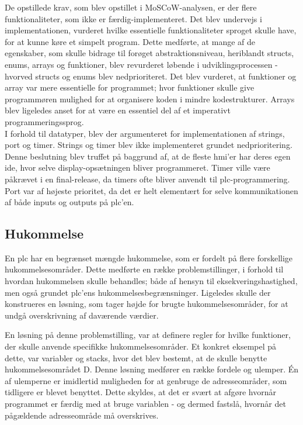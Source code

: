 \noindent De opstillede krav, som blev opstillet i MoSCoW-analysen, er der flere funktionaliteter, som ikke er færdig-implementeret. Det blev undervejs i implementationen, vurderet hvilke essentielle funktionaliteter sproget skulle have, for at kunne køre et simpelt program. Dette medførte, at mange af de egenskaber, som skulle bidrage til forøget abstraktionsniveau, heriblandt structs, enums, arrays og funktioner, blev revurderet løbende i udviklingsprocessen - hvorved structs og enums blev nedprioriteret. Det blev vurderet, at funktioner og array var mere essentielle for programmet; hvor funktioner skulle give programmøren mulighed for at organisere koden i mindre kodestrukturer. Arrays blev ligeledes anset for at være en essentiel del af et imperativt programmeringssprog. \\

\noindent I forhold til datatyper, blev der argumenteret for implementationen af strings, port og timer. Strings og timer blev ikke implementeret grundet nedprioritering. Denne beslutning blev truffet på baggrund af, at de fleste \gls{hmi}'er har deres egen \gls{ide}, hvor selve display-opsætningen bliver programmeret. Timer ville være påkrævet i en final-release, da timers ofte bliver anvendt til \gls{plc}-programmering. 
Port var af højeste prioritet, da det er helt elementært for selve kommunikationen af både inputs og outputs på \gls{plc}'en. 

\subsection*{Hukommelse}
En \gls{plc} har en begrænset mængde hukommelse, som er fordelt på flere forskellige hukommelsesområder. 
Dette medførte en række problemstillinger, i forhold til hvordan hukommelsen skulle behandles; både af hensyn til eksekveringshastighed, men også grundet \gls{plc}'ens hukommelsesbegrænsninger. Ligeledes skulle der konstrueres en løsning, som tager højde for brugte hukommelsesområder, for at undgå overskrivning af daværende værdier. 

En løsning på denne problemstilling, var at definere regler for hvilke funktioner, der skulle anvende specifikke hukommelsesområder. Et konkret eksempel på dette, var variabler og stacks, hvor det blev bestemt, at de skulle benytte hukommelsesområdet D. 
Denne løsning medfører en række fordele og ulemper. Én af ulemperne er imidlertid muligheden for at genbruge de adresseområder, som tidligere er blevet benyttet. Dette skyldes, at det er svært at afgøre hvornår programmet er færdig med at bruge variablen - og dermed fastslå, hvornår det pågældende adresseområde må overskrives. \\

